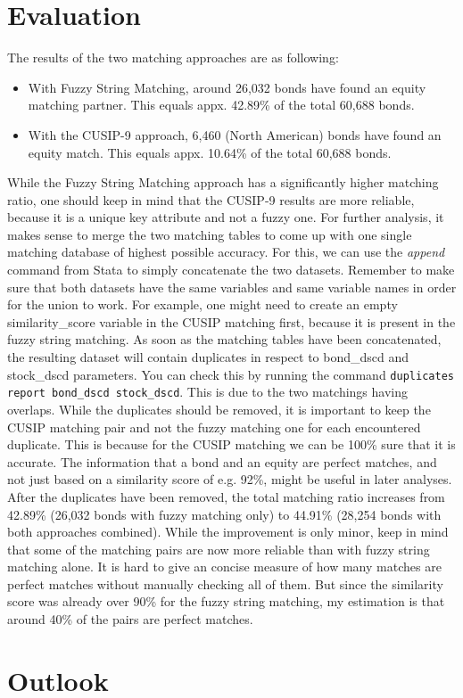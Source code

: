 \section{Evaluation} \label{section:matching-evaluation}
The results of the two matching approaches are as following: 
\begin{itemize}
	\item With Fuzzy String Matching, around 26,032 bonds have found an equity matching partner. This equals appx. 42.89\% of the total 60,688 bonds. 
	\item With the CUSIP-9 approach, 6,460 (North American) bonds have found an equity match. This equals appx. 10.64\% of the total 60,688 bonds. 
\end{itemize}
While the Fuzzy String Matching approach has a significantly higher matching ratio, one should keep in mind that the CUSIP-9 results are more reliable, because it is a unique key attribute and not a fuzzy one. For further analysis, it makes sense to merge the two matching tables to come up with one single matching database of highest possible accuracy. For this, we can use the \textit{append} command from Stata to simply concatenate the two datasets. Remember to make sure that both datasets have the same variables and same variable names in order for the union to work. For example, one might need to create an empty similarity\_score variable in the CUSIP matching first, because it is present in the fuzzy string matching. %
As soon as the matching tables have been concatenated, the resulting dataset will contain duplicates in respect to bond\_dscd and stock\_dscd parameters. You can check this by running the command \lstinline|duplicates report bond_dscd stock_dscd|. This is due to the two matchings having overlaps. While the duplicates should be removed, it is important to keep the CUSIP matching pair and not the fuzzy matching one for each encountered duplicate. This is because for the CUSIP matching we can be 100\% sure that it is accurate. The information that a bond and an equity are perfect matches, and not just based on a similarity score of e.g. 92\%, might be useful in later analyses. 
After the duplicates have been removed, %
the total matching ratio increases from 42.89\% (26,032 bonds with fuzzy matching only) to 44.91\% (28,254 bonds with both approaches combined). While the improvement is only minor, keep in mind that some of the matching pairs are now more reliable than with fuzzy string matching alone. It is hard to give an concise measure of how many matches are perfect matches without manually checking all of them. But since the similarity score was already over 90\% for the fuzzy string matching, my estimation is that around 40\% of the pairs are perfect matches. 

\section{Outlook} \label{section:matching-outlook}







